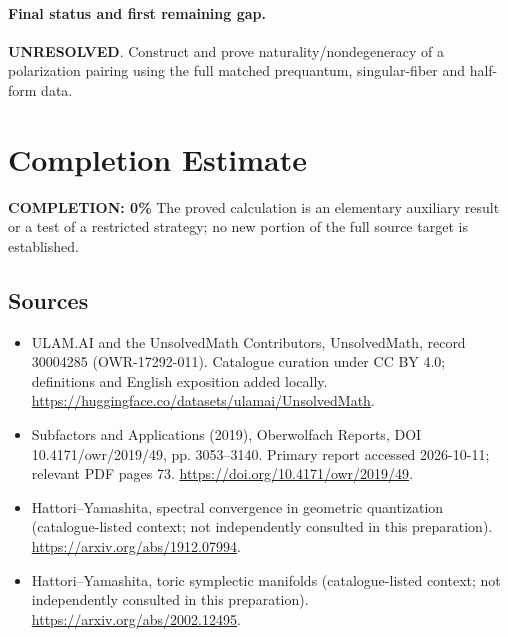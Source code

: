 \documentclass[11pt]{article}
\begin{document}
\paragraph{Final status and first remaining gap.}
\textbf{UNRESOLVED}. Construct and prove naturality/nondegeneracy of a polarization pairing using the full matched prequantum, singular-fiber and half-form data.

\section{Completion Estimate}
\noindent\textbf{COMPLETION: 0\%}
The proved calculation is an elementary auxiliary result or a test of a restricted strategy; no new portion of the full source target is established.

\subsection{Sources}
\begin{itemize}
\item[\hypertarget{source:30004285:1}{S1}] ULAM.AI and the UnsolvedMath Contributors, UnsolvedMath, record 30004285 (OWR-17292-011). Catalogue curation under CC BY 4.0; definitions and English exposition added locally.
\url{https://huggingface.co/datasets/ulamai/UnsolvedMath}.
\item[\hypertarget{source:30004285:2}{S2}] Subfactors and Applications (2019), Oberwolfach Reports, DOI 10.4171/owr/2019/49, pp. 3053--3140. Primary report accessed 2026-10-11; relevant PDF pages 73.
\url{https://doi.org/10.4171/owr/2019/49}.
\item[\hypertarget{source:30004285:3}{S3}] Hattori--Yamashita, spectral convergence in geometric quantization (catalogue-listed context; not independently consulted in this preparation).
\url{https://arxiv.org/abs/1912.07994}.
\item[\hypertarget{source:30004285:4}{S4}] Hattori--Yamashita, toric symplectic manifolds (catalogue-listed context; not independently consulted in this preparation).
\url{https://arxiv.org/abs/2002.12495}.
\end{itemize}
\label{end:30004285}
\end{document}
